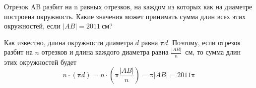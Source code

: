 

\begin{itemize}

\itB Отрезок AB разбит на n равных отрезков, на каждом из которых как на диаметре построена окружность. 
Какие значения может принимать сумма длин всех этих окружностей, если $|AB| = \SI{2011}{\text{см}}$?

\itr 
\begin{center}\end{center}

Как известно, длина окружности диаметра $d$ равна $\text{π}d$. 
Поэтому, если отрезок разбит на $n$ отрезков и длина каждого диаметра равна $\frac{|AB|}{n}$~см,
то сумма длин этих окружностей будет
$$
n \cdot (\text{π} d)=n \cdot (\text{π} \frac{|AB|}{n})=\text{π} |AB|=2011\text{π}
$$

\end{itemize}

